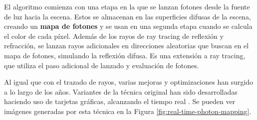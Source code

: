 El algoritmo comienza con una etapa en la que se lanzan fotones desde la fuente de luz hacia la escena.
Estos se almacenan en las superficies difusas de la escena, creando un \textbf{mapa de fotones} y se usan en una segunda etapa cuando se calcula el color de cada píxel.
Además de los rayos de ray tracing de reflexión y refracción, se lanzan rayos adicionales en direcciones aleatorias que buscan en el mapa de fotones, simulando la reflexión difusa.
Es una extensión a ray tracing, que utiliza el paso adicional de lanzado y evaluación de fotones.

Al igual que con el trazado de rayos, varias mejoras y optimizaciones han surgido a lo largo de los años.
Variantes de la técnica original han sido desarrolladas haciendo uso de tarjetas gráficas, alcanzando el tiempo real \cite{real-time-photon-mapping}.
Se pueden ver imágenes generadas por esta técnica en la Figura \ref{fig:real-time-photon-mapping}.


